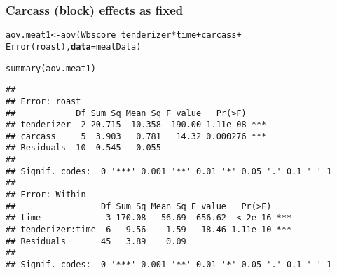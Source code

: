 \documentclass[color=usenames,dvipsnames]{beamer}\usepackage[]{graphicx}\usepackage[]{color}
\makeatletter
\newcommand{\hlopt}[1]{\textcolor[rgb]{0,0,0}{#1}}%
\newcommand{\hlstd}[1]{\textcolor[rgb]{0,0,0}{#1}}%
\newcommand{\hlkwb}[1]{\textcolor[rgb]{0,0.341,0.682}{#1}}%
\newcommand{\hlkwc}[1]{\textcolor[rgb]{0,0,0}{\textbf{#1}}}%
\newcommand{\hlkwd}[1]{\textcolor[rgb]{0.004,0.004,0.506}{#1}}%
\newenvironment{kframe}{%
 \def\at@end@of@kframe{}%
 \ifinner\ifhmode%
  \def\at@end@of@kframe{\end{minipage}}%
  \begin{minipage}{\columnwidth}%
 \fi\fi%
 \def\FrameCommand##1{\hskip\@totalleftmargin \hskip-\fboxsep
 \colorbox{shadecolor}{##1}\hskip-\fboxsep
     \hskip-\linewidth \hskip-\@totalleftmargin \hskip\columnwidth}%
 \MakeFramed {\advance\hsize-\width
   \@totalleftmargin\z@ \linewidth\hsize
   \@setminipage}}%
 {\par\unskip\endMakeFramed%
 \at@end@of@kframe}
\newenvironment{knitrout}{}{} %
\newcommand{\inr}[1]{\colorbox{inlinecolor}{\texttt{#1}}}
\makeatother
\begin{document}
\begin{frame}[fragile]
  \frametitle{Carcass (block) effects as fixed}
\footnotesize
\begin{knitrout}\footnotesize
{}\color{fgcolor}\begin{kframe}
\begin{alltt}
\hlstd{aov.meat1} \hlkwb{<-} \hlkwd{aov}\hlstd{(Wbscore} \hlopt{~} \hlstd{tenderizer} \hlopt{*} \hlstd{time} \hlopt{+} \hlstd{carcass} \hlopt{+}
                 \hlkwd{Error}\hlstd{(roast),} \hlkwc{data}\hlstd{=meatData)}
\end{alltt}
\end{kframe}
\end{knitrout}
\pause
\begin{knitrout}\scriptsize
{}\color{fgcolor}\begin{kframe}
\begin{alltt}
\hlkwd{summary}\hlstd{(aov.meat1)}
\end{alltt}
\begin{verbatim}
## 
## Error: roast
##            Df Sum Sq Mean Sq F value   Pr(>F)    
## tenderizer  2 20.715  10.358  190.00 1.11e-08 ***
## carcass     5  3.903   0.781   14.32 0.000276 ***
## Residuals  10  0.545   0.055                     
## ---
## Signif. codes:  0 '***' 0.001 '**' 0.01 '*' 0.05 '.' 0.1 ' ' 1
## 
## Error: Within
##                 Df Sum Sq Mean Sq F value   Pr(>F)    
## time             3 170.08   56.69  656.62  < 2e-16 ***
## tenderizer:time  6   9.56    1.59   18.46 1.11e-10 ***
## Residuals       45   3.89    0.09                     
## ---
## Signif. codes:  0 '***' 0.001 '**' 0.01 '*' 0.05 '.' 0.1 ' ' 1
\end{verbatim}
\end{kframe}
\end{knitrout}
\end{frame}








\end{document}
